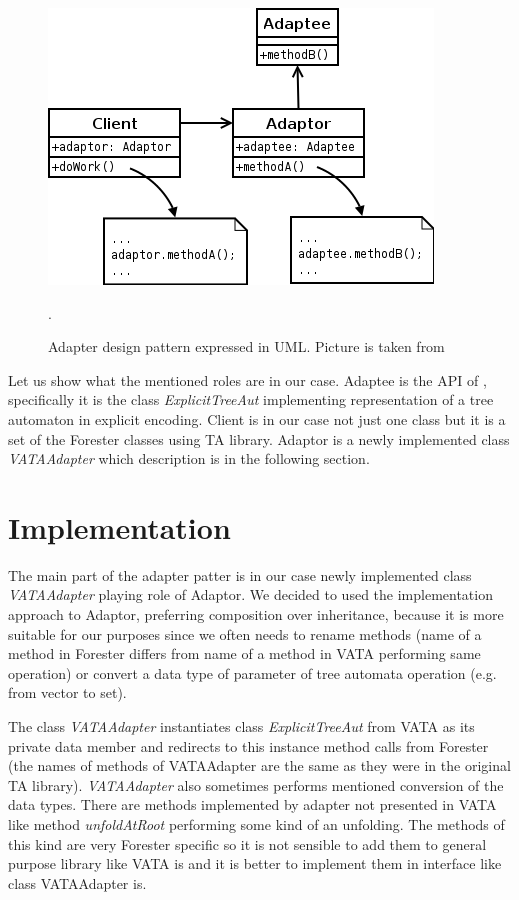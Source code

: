 \begin{figure}
	\begin{center}
		\includegraphics[scale=0.5]{fig/adapter.png}
	\end{center}
	\caption{Adapter design pattern expressed in UML.
	Picture is taken from \cite{wiki:adapter}}.
	\label{fig:adapter}
\end{figure}

Let us show what the mentioned roles are in our case.
Adaptee is the API of \vata, specifically it is the class \emph{ExplicitTreeAut} implementing representation of a tree automaton in explicit encoding.
Client is in our case not just one class but it is a set of the Forester classes using TA library.
Adaptor is a newly implemented class \emph{VATAAdapter} which description is in the following section.

\section{Implementation}
\label{sec:fova_impl}

The main part of the adapter patter is in our case newly implemented class \emph{VATAAdapter} playing role of Adaptor.
We decided to used the implementation approach to Adaptor, preferring composition over inheritance,
because it is more suitable for our purposes since we often needs to rename methods 
(name of a method in Forester differs from name of a method in VATA performing same operation)
or convert a data type of parameter of tree automata operation (e.g. from vector to set). 

The class \emph{VATAAdapter} instantiates class \emph{ExplicitTreeAut} from VATA as its private data member
and redirects to this instance method calls from Forester (the names of methods of VATAAdapter are the same as they were
in the original TA library).
\emph{VATAAdapter} also sometimes performs mentioned conversion of the data types.
There are methods implemented by adapter not presented in VATA like method \emph{unfoldAtRoot}
performing some kind of an unfolding.
The methods of this kind are very Forester specific so it is not sensible to add them to general purpose library like VATA is
and it is better to implement them in interface like class VATAAdapter is.

